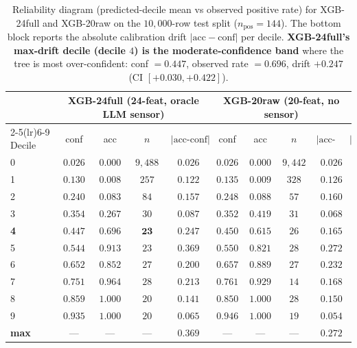 \documentclass{article}
\begin{document}
\begin{table}[t]
\centering
\small
\caption{Reliability diagram (predicted-decile mean vs observed
positive rate) for XGB-24full and XGB-20raw on the $10{,}000$-row
test split ($n_{\text{pos}}{=}144$). The bottom block reports the
absolute calibration drift $|\text{acc} - \text{conf}|$ per decile.
\textbf{XGB-24full's max-drift decile (decile $4$) is the
moderate-confidence band} where the tree is most over-confident:
conf $= 0.447$, observed rate $= 0.696$, drift $+0.247$ (CI
$[+0.030, +0.422]$).}
\label{tab:p8-reliability}
\begin{tabular}{lcccccccc}
\toprule
 & \multicolumn{4}{c}{XGB-24full (24-feat, oracle LLM sensor)} & \multicolumn{4}{c}{XGB-20raw (20-feat, no sensor)} \\
\cmidrule(lr){2-5}\cmidrule(lr){6-9}
Decile & conf & acc & $n$ & $|\text{acc-conf}|$ & conf & acc & $n$ & $|\text{acc-conf}|$ \\
\midrule
0 & $0.026$ & $0.000$ & $9{,}488$ & $0.026$ & $0.026$ & $0.000$ & $9{,}442$ & $0.026$ \\
1 & $0.130$ & $0.008$ & $257$ & $0.122$ & $0.135$ & $0.009$ & $328$ & $0.126$ \\
2 & $0.240$ & $0.083$ & $84$ & $0.157$ & $0.248$ & $0.088$ & $57$ & $0.160$ \\
3 & $0.354$ & $0.267$ & $30$ & $0.087$ & $0.352$ & $0.419$ & $31$ & $0.068$ \\
\textbf{4} & $\mathbf{0.447}$ & $\mathbf{0.696}$ & $\mathbf{23}$ & $\mathbf{0.247}$ & $0.450$ & $0.615$ & $26$ & $0.165$ \\
5 & $0.544$ & $0.913$ & $23$ & $0.369$ & $0.550$ & $0.821$ & $28$ & $0.272$ \\
6 & $0.652$ & $0.852$ & $27$ & $0.200$ & $0.657$ & $0.889$ & $27$ & $0.232$ \\
7 & $0.751$ & $0.964$ & $28$ & $0.213$ & $0.761$ & $0.929$ & $14$ & $0.168$ \\
8 & $0.859$ & $1.000$ & $20$ & $0.141$ & $0.850$ & $1.000$ & $28$ & $0.150$ \\
9 & $0.935$ & $1.000$ & $20$ & $0.065$ & $0.946$ & $1.000$ & $19$ & $0.054$ \\
\midrule
\textbf{max} & --- & --- & --- & $\mathbf{0.369}$ & --- & --- & --- & $0.272$ \\
\bottomrule
\end{tabular}
\end{table}
\end{document}
